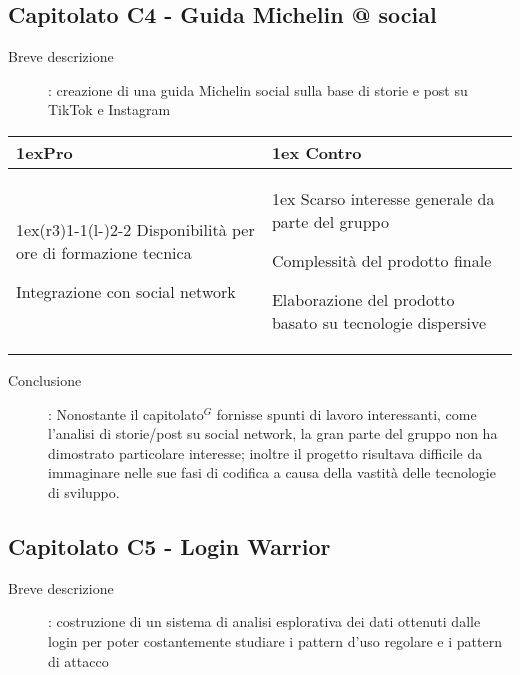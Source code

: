\subsection{Capitolato C4 - Guida Michelin @ social}
\begin{description}
\item [Breve descrizione]: creazione di una guida Michelin social sulla base di storie e post su TikTok e Instagram
\end{description}
\begin{table}[h]
\begin{tabularx}{\linewidth}{>{\parskip1ex}X@{\kern4\tabcolsep}>{\parskip1ex}X}
\hfil\bfseries Pro
&
\hfil\bfseries Contro
\\\cmidrule(r{3\tabcolsep}){1-1}\cmidrule(l{-\tabcolsep}){2-2}
Disponibilità per ore di formazione tecnica \par
Integrazione con social network 
&
Scarso interesse generale da parte del gruppo \par
Complessità del prodotto finale	\par
Elaborazione del prodotto basato su tecnologie dispersive \\
\end{tabularx}
\end{table}
\begin{description}
	\item [Conclusione]: Nonostante il capitolato$^{G}$ fornisse spunti di lavoro interessanti, come l'analisi di storie/post su social network, la gran parte del gruppo non ha dimostrato particolare interesse; inoltre il progetto risultava difficile da immaginare nelle sue fasi di codifica a causa della vastità delle tecnologie di sviluppo.
\end{description}


\newpage

\subsection{Capitolato C5 - Login Warrior}
\begin{description}
\item [Breve descrizione]: costruzione di un sistema di analisi esplorativa dei dati ottenuti dalle login per poter costantemente studiare i pattern d’uso regolare e i pattern di attacco
\end{description}


